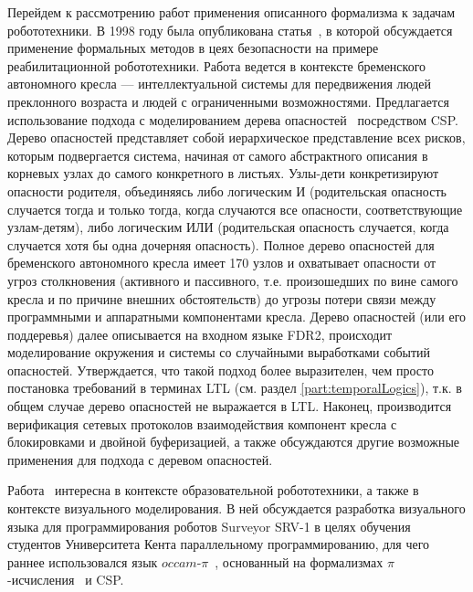 \documentclass[conference]{IEEEtran}
\begin{document}
Перейдем к рассмотрению работ применения описанного формализма к задачам 
робототехники. В 1998 году была опубликована статья~\cite{lankenau1999formal}, 
в которой обсуждается применение формальных методов в цеях безопасности на 
примере реабилитационной робототехники. Работа ведется в контексте бременского 
автономного кресла --- интеллектуальной системы для передвижения людей преклонного 
возраста и людей с ограниченными возможностями. Предлагается использование 
подхода с моделированием дерева опасностей~\cite{vesely1981fault, hansen1996linking} 
посредством CSP. Дерево опасностей представляет собой иерархическое представление 
всех рисков, которым подвергается система, начиная от самого абстрактного описания 
в корневых узлах до самого конкретного в листьях. Узлы-дети конкретизируют опасности 
родителя, объединяясь либо логическим И (родительская опасность случается тогда 
и только тогда, когда случаются все опасности, соответствующие узлам-детям), 
либо логическим ИЛИ (родительская опасность случается, когда случается хотя бы 
одна дочерняя опасность). Полное дерево опасностей для 
бременского автономного кресла имеет 170 узлов и охватывает опасности от угроз 
столкновения (активного и пассивного, т.е. произошедших по вине самого кресла 
и по причине внешних обстоятельств) до угрозы потери связи между программными 
и аппаратными компонентами кресла. Дерево опасностей (или его поддеревья) далее 
описывается на входном языке FDR2, происходит моделирование окружения и системы 
со случайными выработками событий опасностей. Утверждается, что такой подход 
более выразителен, чем просто постановка требований в терминах LTL (см. раздел 
\ref{part:temporalLogics}), т.к. в общем случае дерево опасностей не выражается 
в LTL. Наконец, производится верификация сетевых протоколов взаимодействия 
компонент кресла с блокировками и двойной буферизацией, а также обсуждаются 
другие возможные применения для подхода с деревом опасностей.

Работа~\cite{simpson2008visual} интересна в контексте образовательной 
робототехники, а также в контексте визуального моделирования. В ней обсуждается 
разработка визуального языка для программирования роботов Surveyor SRV-1
в целях обучения студентов Университета Кента параллельному программированию, 
для чего раннее использовался язык $occam\mbox{-}\pi$~\cite{welch2005communicating}, 
основанный на формализмах $\pi$-исчисления~\cite{welch2005communicating} и CSP.
\end{document}
